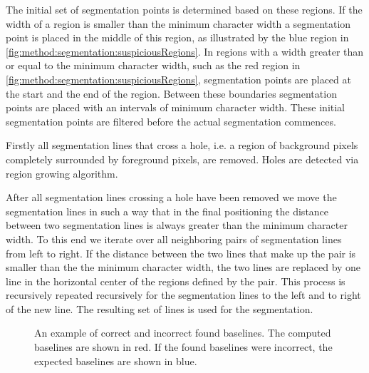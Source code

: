 	The initial set of segmentation points is determined based on these regions. If the width of a region is smaller than the minimum character width a segmentation point is placed in the middle of this region, as illustrated by the blue region in \cref{fig:method:segmentation:suspiciousRegions}. In regions with a width greater than or equal to the minimum character width, such as the red region in \cref{fig:method:segmentation:suspiciousRegions}, segmentation points are placed at the start and the end of the region. Between these boundaries segmentation points are placed with an intervals of minimum character width. These initial segmentation points are filtered before the actual segmentation commences.

	Firstly all segmentation lines that cross a hole, i.e. a region of background pixels completely surrounded by foreground pixels, are removed. Holes are detected via region growing algorithm. 

	After all segmentation lines crossing a hole have been removed we move the segmentation lines in such a way that in the final positioning the distance between two segmentation lines is always greater than the minimum character width. To this end we iterate over all neighboring pairs of segmentation lines from left to right. If the distance between the two lines that make up the pair is smaller than the the minimum character width, the two lines are replaced by one line in the horizontal center of the regions defined by the pair.  This process is recursively repeated recursively for the segmentation lines to the left and to right of the new line. The resulting set of lines is used for the segmentation.

	\begin{figure}[t]
		\centering
		\hspace{0.05\columnwidth}
		\caption{An example of \protect{} correct and \protect{} incorrect found baselines. The computed baselines are shown in red. If the found baselines were incorrect, the expected baselines are shown in blue.}
		\label{fig:method:segmentation:baseline}
	\end{figure}

